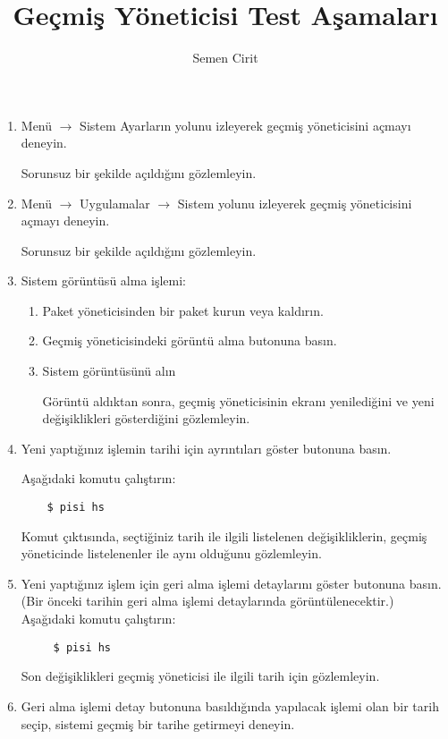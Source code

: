 \documentclass[a4paper,10pt]{article}
\title{Geçmiş Yöneticisi Test Aşamaları}
\author{Semen Cirit}
\begin{document}
\maketitle

\begin{enumerate}
\item Menü $\rightarrow$ Sistem Ayarların yolunu izleyerek geçmiş yöneticisini açmayı deneyin.

Sorunsuz bir şekilde açıldığını gözlemleyin.
\item Menü $\rightarrow$ Uygulamalar $\rightarrow$ Sistem yolunu izleyerek geçmiş yöneticisini açmayı deneyin.

Sorunsuz bir şekilde açıldığını gözlemleyin.
\item Sistem görüntüsü alma işlemi:
\begin{enumerate}
    \item Paket yöneticisinden bir paket kurun veya kaldırın.
    \item Geçmiş yöneticisindeki görüntü alma butonuna basın.
    \item Sistem görüntüsünü alın

   Görüntü aldıktan sonra, geçmiş yöneticisinin ekranı yenilediğini ve yeni değişiklikleri gösterdiğini gözlemleyin.
\end{enumerate}

\item Yeni yaptığınız işlemin tarihi için ayrıntıları göster butonuna basın.

    Aşağıdaki komutu çalıştırın:
\begin{verbatim}
    $ pisi hs
\end{verbatim} 

    Komut çıktısında, seçtiğiniz tarih ile ilgili listelenen değişikliklerin, geçmiş yöneticinde listelenenler ile aynı olduğunu gözlemleyin.

\item Yeni yaptığınız işlem için geri alma işlemi detaylarını göster butonuna basın. (Bir önceki tarihin geri alma işlemi detaylarında görüntülenecektir.)
    Aşağıdaki komutu çalıştırın:
\begin{verbatim}
     $ pisi hs
\end{verbatim} 
    Son değişiklikleri geçmiş yöneticisi ile ilgili tarih için gözlemleyin.


\item Geri alma işlemi detay butonuna basıldığında yapılacak işlemi olan bir tarih seçip, sistemi geçmiş bir tarihe getirmeyi deneyin. 


\end{enumerate}
\end{document}
